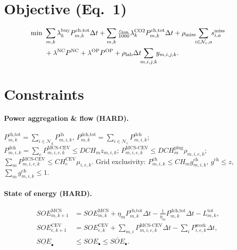 \documentclass[11pt]{article}
\newcommand{\dt}{\Delta t}
\begin{document}
\section{Objective (Eq.\ 1)}
\begin{align}
\min\ &\sum_{m,k}\lambda^{\text{buy}}_{k}P^{\text{ch,tot}}_{m,k}\dt
      +\sum_{m,k}\tfrac{c_{\text{ton}}}{1000}\lambda^{\text{CO2}}_{k}P^{\text{ch,tot}}_{m,k}\dt
      +\rho_{\text{miss}}\!\!\sum_{i\in\mathcal{N}_c,a}\!\! s^{\text{miss}}_{i,a}\notag\\
     &+\lambda^{\text{NC}}P^{\text{NC}}+\lambda^{\text{OP}}P^{\text{OP}}
      +\rho_{\text{lab}}\dt\!\!\sum_{m,i,j,k}\!\! y_{m,i,j,k}.
\end{align}

\section{Constraints}

\paragraph{Power aggregation \& flow (HARD).}
$P^{\text{ch,tot}}_{m,k}=\sum_{i\in\mathcal{N}_g}P^{\text{ch}}_{m,i,k}$,
$P^{\text{dch,tot}}_{m,k}=\sum_{i\in\mathcal{N}_c}P^{\text{dch}}_{m,i,k}$;
$P^{\text{dch}}_{m,i,k}=\sum_e P^{\text{MCS-CEV}}_{m,i,e,k}\le DCH_m z_{m,i,k}$;
$P^{\text{MCS-CEV}}_{m,i,e,k}\le DCH^{\text{plug}}_m\rho_{m,i,e,k}$;
$\sum_m P^{\text{MCS-CEV}}_{m,i,e,k}\le CH^{\text{CEV}}_e\mu_{i,e,k}$.
Grid exclusivity: $P^{\text{ch}}_{m,i,k}\le CH_m g^{\text{ch}}_{m,i,k}$,
$g^{\text{ch}}\le z$, $\sum_m g^{\text{ch}}_{m,i,k}\le 1$.

\paragraph{State of energy (HARD).}
\begin{align}
SOE^{\text{MCS}}_{m,k+1}&=SOE^{\text{MCS}}_{m,k}+\eta_m P^{\text{ch,tot}}_{m,k}\dt-\tfrac{1}{\eta_m}P^{\text{dch,tot}}_{m,k}\dt-L^{\text{tot}}_{m,k},\\
SOE^{\text{CEV}}_{e,k+1}&=SOE^{\text{CEV}}_{e,k}+\textstyle\sum_{m,i}P^{\text{MCS-CEV}}_{m,i,e,k}\dt-\sum_i P^{\text{work}}_{i,e,k}\dt,\\
\underline{SOE}_\bullet&\le SOE_\bullet\le\overline{SOE}_\bullet .
\end{align}
\end{document}
